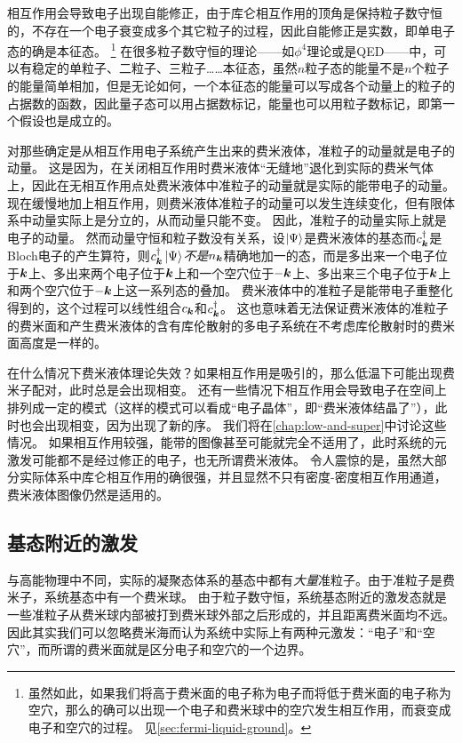相互作用会导致电子出现自能修正，由于库仑相互作用的顶角是保持粒子数守恒的，不存在一个电子衰变成多个其它粒子的过程，因此自能修正是实数，即单电子态的确是本征态。%
\footnote{
    虽然如此，如果我们将高于费米面的电子称为电子而将低于费米面的电子称为空穴，那么的确可以出现一个电子和费米球中的空穴发生相互作用，而衰变成电子和空穴的过程。
    见\autoref{sec:fermi-liquid-ground}。
}%
在很多粒子数守恒的理论——如$\phi^4$理论或是QED——中，可以有稳定的单粒子、二粒子、三粒子……本征态，虽然$n$粒子态的能量不是$n$个粒子的能量简单相加，但是无论如何，一个本征态的能量可以写成各个动量上的粒子的占据数的函数，因此量子态可以用占据数标记，能量也可以用粒子数标记，即第一个假设也是成立的。

对那些确定是从相互作用电子系统产生出来的费米液体，准粒子的动量就是电子的动量。
这是因为，在关闭相互作用时费米液体“无缝地”退化到实际的费米气体上，因此在无相互作用点处费米液体中准粒子的动量就是实际的能带电子的动量。
现在缓慢地加上相互作用，则费米液体准粒子的动量可以发生连续变化，但有限体系中动量实际上是分立的，从而动量只能不变。
因此，准粒子的动量实际上就是电子的动量。
然而动量守恒和粒子数没有关系，设$\ket{\Psi}$是费米液体的基态而$c^\dagger_{\vb*{k}}$是Bloch电子的产生算符，则$c^\dagger_{\vb*{k}} \ket{\Psi}$\emph{不是}$n_{\vb*{k}}$精确地加一的态，而是多出来一个电子位于$\vb*{k}$上、多出来两个电子位于$\vb*{k}$上和一个空穴位于$-\vb*{k}$上、多出来三个电子位于$\vb*{k}$上和两个空穴位于$-\vb*{k}$上这一系列态的叠加。
费米液体中的准粒子是能带电子重整化得到的，这个过程可以线性组合$c_{\vb*{k}}$和$c^\dagger_{\vb*{k}}$。
这也意味着无法保证费米液体的准粒子的费米面和产生费米液体的含有库伦散射的多电子系统在不考虑库伦散射时的费米面高度是一样的。

在什么情况下费米液体理论失效？如果相互作用是吸引的，那么低温下可能出现费米子配对，此时总是会出现相变。
还有一些情况下相互作用会导致电子在空间上排列成一定的模式（这样的模式可以看成“电子晶体”，即“费米液体结晶了”），此时也会出现相变，因为出现了新的序。
我们将在\autoref{chap:low-and-super}中讨论这些情况。
如果相互作用较强，能带的图像甚至可能就完全不适用了，此时系统的元激发可能都不是经过修正的电子，也无所谓费米液体。
令人震惊的是，虽然大部分实际体系中库仑相互作用的确很强，并且显然不只有密度-密度相互作用通道，费米液体图像仍然是适用的。

\subsection{基态附近的激发}\label{sec:fermi-liquid-ground}

与高能物理中不同，实际的凝聚态体系的基态中都有\emph{大量}准粒子。由于准粒子是费米子，系统基态中有一个费米球。
由于粒子数守恒，系统基态附近的激发态就是一些准粒子从费米球内部被打到费米球外部之后形成的，并且距离费米面均不远。
因此其实我们可以忽略费米海而认为系统中实际上有两种元激发：“电子”和“空穴”，而所谓的费米面就是区分电子和空穴的一个边界。

